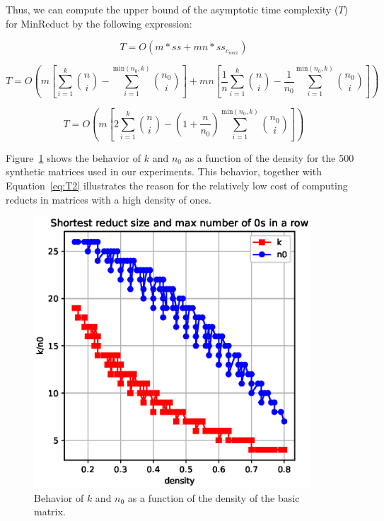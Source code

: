 \documentclass[citenumber]{llncs}
\begin{document}
	Thus, we can compute the upper bound of the asymptotic time complexity ($T$) for MinReduct by the following expression:
	
	\begin{equation}
	T = O\left(m*ss + mn*ss_{c_{max}}\label{eq:T1}\right)
	\end{equation}
	
	\begin{equation*}
	T = O\left(m\left[\sum_{i=1}^{k} \binom{n}{i} - \sum_{i=1}^{\mathrm{min}(n_0,k)} \binom{n_0}{i}\right]+mn\left[\frac{1}{n}\sum_{i=1}^{k} \binom{n}{i} - \frac{1}{n_0}\sum_{i=1}^{\mathrm{min}(n_0,k)} \binom{n_0}{i}\right]\right)
	\end{equation*}	
	
	\begin{equation}
	T = O\left(m\left[2\sum_{i=1}^{k} \binom{n}{i} - \left(1 + \frac{n}{n_0}\right)\sum_{i=1}^{\mathrm{min}(n_0,k)} \binom{n_0}{i}\right]\right)\label{eq:T2}
	\end{equation}	
	
	Figure~\ref{fig:n0} shows the behavior of  $k$ and $n_0$ as a function of the density for the 500 synthetic matrices used in our experiments. This behavior, together with Equation~\ref{eq:T2} illustrates the reason for the relatively low cost of computing reducts in matrices with a high density of ones.
		
	\begin{figure}[hbt]
		\begin{center}
			\includegraphics[height=4in]{Length_and_N0_vs_denisty.eps} 
		\end{center}
		\caption{Behavior of $k$ and $n_0$ as a function of the density of the basic matrix.}\label{fig:n0}
	\end{figure}  
	
\end{document}
